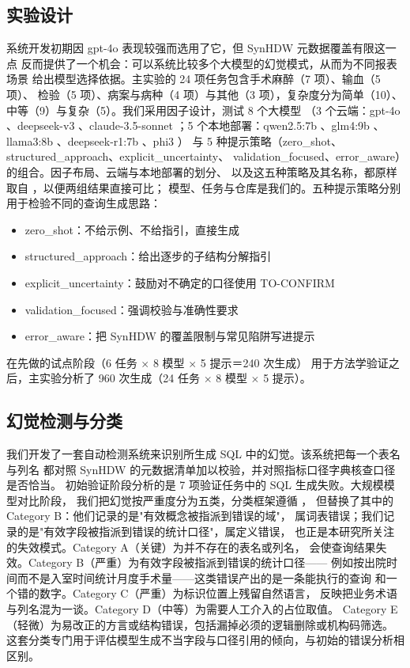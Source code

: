 \documentclass[11pt,a4paper]{article}
\begin{document}
\subsection{实验设计}\label{sec:cn-expdesign}
系统开发初期因 gpt-4o 表现较强而选用了它，但 SynHDW 元数据覆盖有限这一点
反而提供了一个机会：可以系统比较多个大模型的幻觉模式，从而为不同报表场景
给出模型选择依据。主实验的 24 项任务包含手术麻醉（7 项）、输血（5 项）、
检验（5 项）、病案与病种（4 项）与其他（3 项），复杂度分为简单（10）、
中等（9）与复杂（5）。我们采用因子设计，测试 8 个大模型
（3 个云端：gpt-4o \cite{gpt4}、deepseek-v3 \cite{dsv3}、claude-3.5-sonnet
\cite{claude35}；5 个本地部署：qwen2.5:7b \cite{qwen25}、glm4:9b \cite{glm4}、
llama3:8b \cite{llama3}、deepseek-r1:7b \cite{dsr1}、phi3 \cite{phi3}）
与 5 种提示策略（zero\_shot、structured\_approach、explicit\_uncertainty、
validation\_focused、error\_aware）的组合。因子布局、云端与本地部署的划分、
以及这五种策略及其名称，都原样取自 \cite{lee2025}，以便两组结果直接可比；
模型、任务与仓库是我们的。五种提示策略分别用于检验不同的查询生成思路：

\begin{itemize}[leftmargin=1.6em,itemsep=1pt,topsep=2pt]
  \item zero\_shot：不给示例、不给指引，直接生成
  \item structured\_approach：给出逐步的子结构分解指引
  \item explicit\_uncertainty：鼓励对不确定的口径使用 TO-CONFIRM
  \item validation\_focused：强调校验与准确性要求
  \item error\_aware：把 SynHDW 的覆盖限制与常见陷阱写进提示
\end{itemize}

\noindent 在先做的试点阶段（6 任务 $\times$ 8 模型 $\times$ 5 提示＝240 次生成）
用于方法学验证之后，主实验分析了 960 次生成（24 任务 $\times$ 8 模型
$\times$ 5 提示）。

\subsection{幻觉检测与分类}
我们开发了一套自动检测系统来识别所生成 SQL 中的幻觉。该系统把每一个表名与列名
都对照 SynHDW 的元数据清单加以校验，并对照指标口径字典核查口径是否恰当。
初始验证阶段分析的是 7 项验证任务中的 SQL 生成失败。大规模模型对比阶段，
我们把幻觉按严重度分为五类，分类框架遵循 \cite{lee2025}，
但替换了其中的 Category B：他们记录的是"有效概念被指派到错误的域"，
属词表错误；我们记录的是"有效字段被指派到错误的统计口径"，属定义错误，
也正是本研究所关注的失效模式。Category A（关键）为并不存在的表名或列名，
会使查询结果失效。Category B（严重）为有效字段被指派到错误的统计口径——
例如按出院时间而不是入室时间统计月度手术量——这类错误产出的是一条能执行的查询
和一个错的数字。Category C（严重）为标识位置上残留自然语言，
反映把业务术语与列名混为一谈。Category D（中等）为需要人工介入的占位取值。
Category E（轻微）为易改正的方言或结构错误，包括漏掉必须的逻辑删除或机构码筛选。
这套分类专门用于评估模型生成不当字段与口径引用的倾向，与初始的错误分析相区别。
\end{document}
